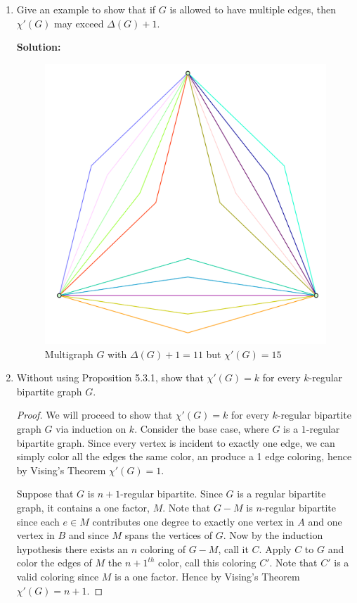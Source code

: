 \documentclass[12pt]{article}
\newcommand{\localhead}[1]{\par\smallskip\textbf{#1}\nobreak\\}%
\newcommand\solution{\localhead{Solution:}}
\begin{document}
\begin{enumerate}
	\item Give an example to show that if $G$ is allowed to have multiple edges, then $\chi'(G)$ may exceed $\Delta(G) +1$.\\
	\solution
	\begin{figure}[H]
		\begin{center}
			\caption{Multigraph $G$ with $\Delta(G) + 1 = 11$ but $\chi'(G) = 15$}
			\includegraphics[width=.55\textwidth]{Multigraph.png}
		\end{center}
	\end{figure}



	\newpage
	





	\item Without using Proposition 5.3.1, show that $\chi'(G) =k$ for every $k$-regular bipartite graph $G$.
	\begin{proof} We will proceed to show that $\chi'(G) =k$ for every $k$-regular bipartite graph $G$ via induction on $k$. Consider the base case, where $G$ is a $1$-regular bipartite graph. Since every vertex is incident to exactly one edge, we can simply color all the edges the same color, an produce a 1 edge coloring, hence by Vising's Theorem $\chi'(G) =1$. 

		Suppose that $G$ is $n + 1$-regular bipartite. Since $G$ is a regular bipartite graph, it contains a one factor, $M$. Note that $G - M$ is $n$-regular bipartite since each $e \in M$ contributes one degree to exactly one vertex in $A$ and one vertex in $B$ and since $M$ spans the vertices of $G$. Now by the induction hypothesis there exists an $n$ coloring of $G - M$, call it $C$. Apply $C$ to $G$ and color the edges of $M$ the $n+1^{th}$ color, call this coloring $C'$. Note that $C'$ is a valid coloring since $M$ is a one factor. Hence by Vising's Theorem $\chi'(G) = n + 1$.
	\end{proof}
	\newpage
	








\end{enumerate}
\end{document}
